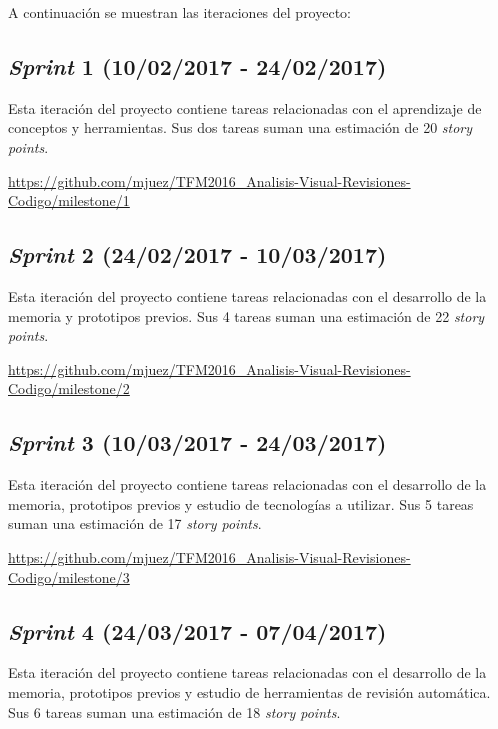 A continuación se muestran las iteraciones del proyecto:

\subsection{\textit{Sprint} 1 (10/02/2017 - 24/02/2017)}

Esta iteración del proyecto contiene tareas relacionadas con el aprendizaje de conceptos y herramientas. Sus dos tareas suman una estimación de 20 \textit{story points}.

\url{https://github.com/mjuez/TFM2016_Analisis-Visual-Revisiones-Codigo/milestone/1}


\subsection{\textit{Sprint} 2 (24/02/2017 - 10/03/2017)}

Esta iteración del proyecto contiene tareas relacionadas con el desarrollo de la memoria y prototipos previos. Sus 4 tareas suman una estimación de 22 \textit{story points}.

\url{https://github.com/mjuez/TFM2016_Analisis-Visual-Revisiones-Codigo/milestone/2}


\subsection{\textit{Sprint} 3 (10/03/2017 - 24/03/2017)}

Esta iteración del proyecto contiene tareas relacionadas con el desarrollo de la memoria, prototipos previos y estudio de tecnologías a utilizar. Sus 5 tareas suman una estimación de 17 \textit{story points}.

\url{https://github.com/mjuez/TFM2016_Analisis-Visual-Revisiones-Codigo/milestone/3}


\subsection{\textit{Sprint} 4 (24/03/2017 - 07/04/2017)}

Esta iteración del proyecto contiene tareas relacionadas con el desarrollo de la memoria, prototipos previos y estudio de herramientas de revisión automática. Sus 6 tareas suman una estimación de 18 \textit{story points}.

